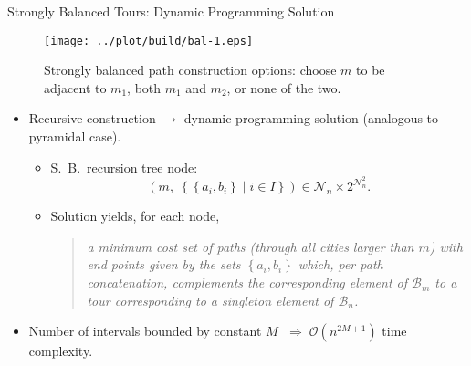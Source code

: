\documentclass[
  size=8pt,
  style=klope,
  paper=screen,
  mode=present,
  nohandoutpagebreaks,
  pauseslide,
  hlsections,
  fleqn,
]{powerdot}
\def\eqitspace{\vspace{-5mm}}
\begin{document}
\begin{slide}[toc=]{Strongly Balanced Tours: Dynamic Programming Solution}
    \begin{figure}[H]
      \centering
      \texttt{[image: ../plot/build/bal-1.eps]}
      \caption{
        Strongly balanced path construction options: choose $m$ to be adjacent to $m_1$, both $m_1$ and $m_2$, or none of the two.
     }
    \end{figure}
  \begin{itemize}
  \item
    Recursive construction $\rightarrow$ dynamic programming solution (analogous to pyramidal case).
    \begin{itemize}
    \item
      S.\ B.\ recursion tree node:
      \begin{equation}
      \left(m, \;
      \left\{\left\{a_i,b_i\right\} \mid i \in I\right\}\right)
       \in \mathcal{N}_n \times 2^{\mathcal{N}_n^2}.
      \end{equation}
      \eqitspace%
    \item
      Solution yields, for each node,
      \vspace{2mm}
      \begin{quote}
      {\itshape
        a minimum cost set of paths
        (through all cities larger than $m$)
        with end points given by the sets $\left\{a_i,b_i\right\}$
        which, per path concatenation,
        complements the corresponding element of $\mathcal{B}_m$
        to a tour corresponding to a singleton element of $\mathcal{B}_n$.
      }
      \end{quote}
      \vspace{2mm}
    \end{itemize}
    \eqitspace%
  \item
    Number of intervals bounded by constant $M$ $\;\Rightarrow\;
    \mathcal{O}\left(n^{2M+1}\right)$ time complexity.
  \end{itemize}
\end{slide}
\end{document}
